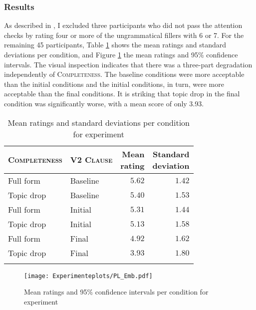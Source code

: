\subsubsection{Results}\label{sec:exp.embedded.results}
As described in , I excluded three participants who did not pass the attention checks by rating four or more of the ungrammatical fillers with 6 or 7.
For the remaining 45 participants, Table \ref{tab:descriptives.embedded} shows the mean ratings and standard deviations per condition, and Figure \ref{fig:pl.embedded} the mean ratings and 95\% confidence intervals.
The visual inspection indicates that there was a three-part degradation independently of \textsc{Completeness}.
The baseline conditions were more acceptable than the initial conditions and the initial conditions, in turn, were more acceptable than the final conditions.
It is striking that topic drop in the final condition was significantly worse, with a mean score of only 3.93.

\begin{table}
\caption{Mean ratings and standard deviations per condition for experiment }
\centering
\begin{tabular}{llrr}
\lsptoprule
\textsc{Completeness} & \textsc{V2 Clause} & \Centerstack{Mean\\rating} & \Centerstack{Standard\\deviation} \\
\midrule
Full form & Baseline &  $5.62$ & $1.42$ \\
Topic drop & Baseline & $5.40$ & $1.53$ \\
Full form & Initial & $5.31$ & $1.44$ \\
Topic drop & Initial &  $5.13$ & $1.58$\\
Full form & Final &  $4.92$ & $1.62$ \\
Topic drop & Final & $3.93$ & $1.80$ \\
\lspbottomrule
\end{tabular}
\label{tab:descriptives.embedded}
\end{table}

\begin{figure}
\centering
\texttt{[image: Experimenteplots/PL\_Emb.pdf]}
\caption{Mean ratings and 95\% confidence intervals per condition for experiment }
\label{fig:pl.embedded} %
\end{figure}

